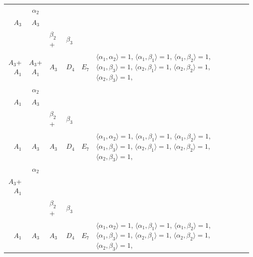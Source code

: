\documentclass[12pt]{report}
\begin{document}
\begin{appendix}
{\begin{longtable}{rcl p{1cm}p{1cm}p{3cm} }
\begin{tabular}{cc}$\alpha_1$+ & $\alpha_2$\\\tiny{ $A_3$ } & \tiny{ $A_3$ }\end{tabular} &\begin{tabular}{c} = \\~ \end{tabular} & \begin{tabular}{ccc}$\beta_1$+ & $\beta_2$+ & $\beta_3$\\\tiny{ $A_3$+$A_1$ } & \tiny{ $A_3$+$A_1$ } & \tiny{ $A_3$ }\end{tabular} & $D_4$ & $E_7$ & $\langle\alpha_1, \alpha_2\rangle=1$,  $\langle\alpha_1, \beta_1\rangle=1$, $\langle\alpha_1, \beta_2\rangle=1$, $\langle\alpha_1, \beta_3\rangle=1$, $\langle\alpha_2, \beta_1\rangle=1$, $\langle\alpha_2, \beta_2\rangle=1$, $\langle\alpha_2, \beta_3\rangle=1$, 
\\
\begin{tabular}{cc}$\alpha_1$+ & $\alpha_2$\\\tiny{ $A_1$ } & \tiny{ $A_3$ }\end{tabular} &\begin{tabular}{c} = \\~ \end{tabular} & \begin{tabular}{ccc}$\beta_1$+ & $\beta_2$+ & $\beta_3$\\\tiny{ $A_1$ } & \tiny{ $A_3$ } & \tiny{ $A_3$ }\end{tabular} & $D_4$ & $E_7$ & $\langle\alpha_1, \alpha_2\rangle=1$,  $\langle\alpha_1, \beta_1\rangle=1$, $\langle\alpha_1, \beta_2\rangle=1$, $\langle\alpha_1, \beta_3\rangle=1$, $\langle\alpha_2, \beta_1\rangle=1$, $\langle\alpha_2, \beta_2\rangle=1$, $\langle\alpha_2, \beta_3\rangle=1$, 
\\
\begin{tabular}{cc}$\alpha_1$+ & $\alpha_2$\\\tiny{ $A_3$+$A_1$ } & \tiny{  }\end{tabular} &\begin{tabular}{c} = \\~ \end{tabular} & \begin{tabular}{ccc}$\beta_1$+ & $\beta_2$+ & $\beta_3$\\\tiny{ $A_1$ } & \tiny{ $A_3$ } & \tiny{ $A_3$ }\end{tabular} & $D_4$ & $E_7$ & $\langle\alpha_1, \alpha_2\rangle=1$,  $\langle\alpha_1, \beta_1\rangle=1$, $\langle\alpha_1, \beta_2\rangle=1$, $\langle\alpha_1, \beta_3\rangle=1$, $\langle\alpha_2, \beta_1\rangle=1$, $\langle\alpha_2, \beta_2\rangle=1$, $\langle\alpha_2, \beta_3\rangle=1$, 

\end{longtable}}
\end{appendix}
\end{document}
